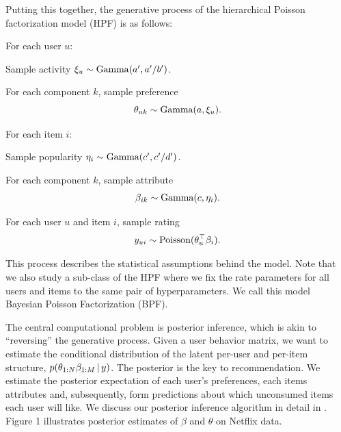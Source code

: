 Putting this together, the generative process of the hierarchical
Poisson factorization model (HPF) is as follows:
\begin{enumerate*}
\item For each user $u$:
  \begin{enumerate*}
  \item Sample activity $\xi_u \sim \textrm{Gamma}(a', a'/b')$.
  \item For each component $k$, sample preference $$\theta_{uk} \sim
    \textrm{Gamma}(a, \xi_u).$$
  \end{enumerate*}

\item For each item $i$:
  \begin{enumerate*}
    \item Sample popularity $\eta_i \sim \textrm{Gamma}(c', c'/d')$.
    \item For each component $k$, sample attribute
      $$\beta_{ik} \sim \textrm{Gamma}(c, \eta_i).$$
  \end{enumerate*}

\item For each user $u$ and item $i$, sample rating
  $$y_{ui} \sim
  \textrm{Poisson}(\theta_u^\top \beta_i).$$
\end{enumerate*}
This process describes the statistical assumptions behind the model.
Note that we also study a sub-class of the HPF where we fix the rate
parameters for all users and items to the same pair of
hyperparameters. We call this model Bayesian Poisson Factorization
(BPF).

The central computational problem is posterior inference, which is
akin to ``reversing'' the generative process.  Given a user behavior
matrix, we want to estimate the conditional distribution of the latent
per-user and per-item structure, $p(\theta_{1:N} \beta_{1:M} \,\vert\, y)$.
The posterior is the key to recommendation.  We estimate the posterior
expectation of each user's preferences, each items attributes and,
subsequently, form predictions about which unconsumed items each user
will like.  We discuss our posterior inference algorithm in detail in
.  Figure 1 illustrates posterior estimates of
$\beta$ and $\theta$ on Netflix data.



